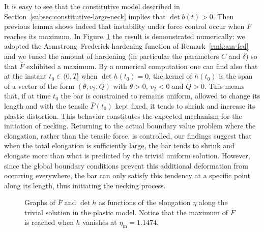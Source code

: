 \documentclass[a4paper,10pt,oneside]{amsbook}
\numberwithin{section}{chapter}
\numberwithin{equation}{chapter}
\theoremstyle{definition}
\begin{document}
It is easy to see that the constitutive model described in Section~\ref{subsec:constitutive-large-neck} implies that $\det b(t)>0$. Then previous lemma shows indeed that instability under force control occur when $\bar F$ reaches its maximum. In Figure~\ref{fig:instabilitypl} the result is demonstrated numerically: we adopted the Armstrong--Frederick hardening function of Remark~\ref{rmk:am-fed} and we tuned the amount of hardening (in particular the parameters $C$ and $\delta$) so that $\bar{F}$ exhibited a maximum. By a numerical computation one can find also that at the instant $t_0\in(0,T]$ when $\det h(t_0)=0$, the kernel of $h(t_0)$ is the span of a vector of the form $(\theta,v_2,Q)$ with $\theta>0$, $v_2<0$ and $Q>0$. This means that, if at time $t_0$ the bar is constrained to remains uniform, allowed to change its length and with the tensile $\bar{F}(t_0)$ kept fixed, it tends to shrink and increase its plastic distortion. This behavior constitutes the expected mechanism for the initiation of necking. Returning to the actual boundary value problem where the elongation, rather than the tensile force, is controlled, our findings suggest that when the total elongation is sufficiently large, the bar tends to shrink and elongate more than what is predicted by the trivial uniform solution. However, since the global boundary conditions prevent this additional deformation from occurring everywhere, the bar can only satisfy this tendency at a specific point along its length, thus initiating the necking process.
\begin{figure}[htp]
\hfill
{}
\caption{Graphs of $\bar F$ and $\det h$ as functions of the elongation $\eta$ along the trivial solution in the plastic model. Notice that the maximum of $\bar{F}$ is reached when $h$ vanishes at $\eta_\text{m}=1.1474$.}
\label{fig:instabilitypl}
\end{figure}
\end{document}
